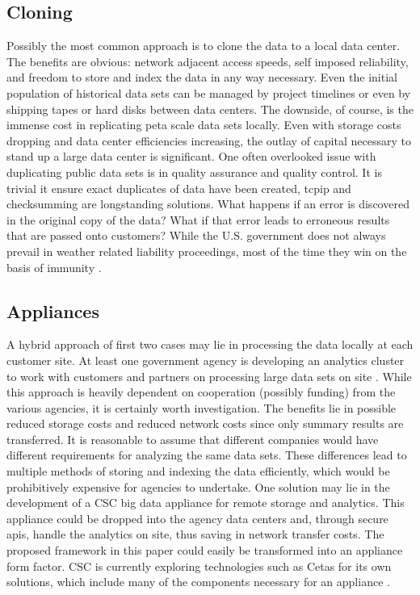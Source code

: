 \subsection{Cloning}
Possibly the most common approach is to clone the data to a local data center. The benefits are obvious: network adjacent access speeds, self imposed reliability, and freedom to store and index the data in any way necessary.  Even the initial population of historical data sets can be managed by project timelines or even by shipping tapes or hard disks between data centers. The downside, of course, is the immense cost in replicating peta scale data sets locally. Even with storage costs dropping and data center efficiencies increasing, the outlay of capital necessary to stand up a large data center is significant. One often overlooked issue with duplicating public data sets is in quality assurance and quality control. It is trivial it ensure exact duplicates of data have been created, \gls{tcpip} and checksumming are longstanding solutions. What happens if an error is discovered in the original copy of the data? What if that error leads to erroneous results that are passed onto customers?  While the U.S. government does not always prevail in weather related liability proceedings, most of the time they win on the basis of immunity  \cite[Chapter~4]{fairweather}. 
\subsection{Appliances}
A hybrid approach of first two cases may lie in processing the data locally at each customer site. At least one government agency is developing an analytics cluster to work with customers and partners on processing large data sets on site \cite{duffy}. While this approach is heavily dependent on cooperation (possibly funding) from the various agencies, it is certainly worth investigation. The benefits lie in possible reduced storage costs and reduced network costs since only summary results are transferred. It is reasonable to assume that different companies would have different requirements for analyzing the same data sets. These differences lead to multiple methods of storing and indexing the data efficiently, which would be prohibitively expensive for agencies to undertake.  One solution may lie in the development of a \textsc{CSC} big data appliance for remote storage and analytics. This appliance could be dropped into the agency data centers and, through secure \gls{api}s, handle the analytics on site, thus saving in network transfer costs. The proposed framework in this paper could easily be transformed into an appliance form factor. \textsc{CSC} is currently exploring technologies such as Cetas for its own solutions,  which include many of the components necessary for an appliance \cite{cetas}.\\

